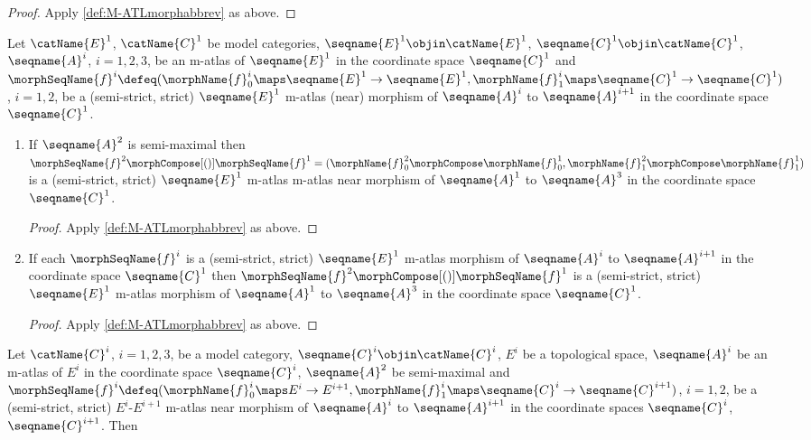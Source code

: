 \documentclass{article}
\begin{document}
\begin{corollary}
\begin{enumerate}[resume]
\begin{proof}
Apply \cref{def:M-ATLmorphabbrev} as above.
\end{proof}
\end{enumerate}

Let $\catName{E}^1$, $\catName{C}^1$ be model categories,
$\seqname{E}^1 \objin \catName{E}^1$,
$\seqname{C}^1 \objin \catName{C}^1$, $\seqname{A}^i$, $i=1,2,3$, be an
m-atlas of $\seqname{E}^1$ in the coordinate space $\seqname{C}^1$ and
$
  \morphSeqName{f}^i \defeq
    (
      \morphName{f}^i_0 \maps \seqname{E}^1 \to \seqname{E}^1,
      \morphName{f}^i_1 \maps \seqname{C}^1 \to \seqname{C}^1
    )
$, $i=1,2$,
be a (semi-strict, strict) $\seqname{E}^1$ m-atlas (near) morphism of
$\seqname{A}^i$ to $\seqname{A}^{i+1}$ in the coordinate space
$\seqname{C}^1$.

\begin{enumerate}[resume]
\item
If $\seqname{A}^2$ is semi-maximal then
$
  \morphSeqName{f}^2 \morphCompose[()] \morphSeqName{f}^1 =
    (
      \morphName{f}^2_0 \morphCompose \morphName{f}^1_0,
      \morphName{f}^2_1 \morphCompose \morphName{f}^1_1
    )
$
is a (semi-strict, strict) $\seqname{E}^1$ m-atlas m-atlas near morphism
of $\seqname{A}^1$ to $\seqname{A}^3$ in the coordinate space
$\seqname{C}^1$.

\begin{proof}
Apply \cref{def:M-ATLmorphabbrev} as above.
\end{proof}

\item
If each $\morphSeqName{f}^i$ is a (semi-strict, strict) $\seqname{E}^1$
m-atlas morphism of $\seqname{A}^i$ to $\seqname{A}^{i+1}$ in the
coordinate space $\seqname{C}^1$ then
$\morphSeqName{f}^2 \morphCompose[()] \morphSeqName{f}^1$ is a (semi-strict,
strict) $\seqname{E}^1$ m-atlas morphism of $\seqname{A}^1$ to
$\seqname{A}^3$ in the coordinate space $\seqname{C}^1$.

\begin{proof}
Apply \cref{def:M-ATLmorphabbrev} as above.
\end{proof}
\end{enumerate}

Let $\catName{C}^i$, $i=1,2,3$, be a model category,
$\seqname{C}^i \objin \catName{C}^i$, $E^i$ be a topological space,
$\seqname{A}^i$ be an m-atlas of $E^i$ in the coordinate space
$\seqname{C}^i$,
$\seqname{A}^2$ be semi-maximal and
$
  \morphSeqName{f}^i \defeq \\*
    (
      \morphName{f}^i_0 \maps E^i \to E^{i+1},
      \morphName{f}^i_1 \maps \seqname{C}^i \to \seqname{C}^{i+1}
    )
$, $i=1,2$,
be a (semi-strict, strict) $E^i$-$E^{i+1}$ m-atlas near morphism of
$\seqname{A}^i$ to $\seqname{A}^{i+1}$ in the coordinate spaces
$\seqname{C}^i$, $\seqname{C}^{i+1}$. Then


\end{corollary}
\end{document}
